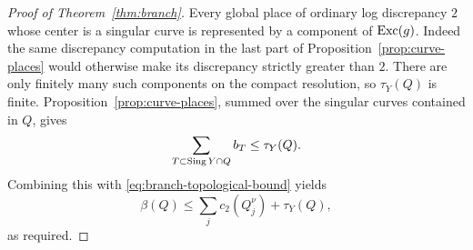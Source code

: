 \begin{proof}[Proof of Theorem~\ref{thm:branch}]
Every global place of ordinary log discrepancy \(2\) whose center
is a singular curve is represented by a component of \(\operatorname{Exc}(g)\).
Indeed the same discrepancy computation in the last part of
Proposition~\ref{prop:curve-places} would otherwise make its
discrepancy strictly greater than \(2\).  There are only finitely
many such components on the compact resolution, so
\(\tau_Y(Q)\) is finite.  Proposition~\ref{prop:curve-places},
summed over the singular curves contained in \(Q\), gives
\[
 \sum_{T\subset\operatorname{Sing} Y\cap Q} b_T\le\tau_Y(Q).
\]
Combining this with \eqref{eq:branch-topological-bound} yields
\[
 \beta(Q)\le \sum_j c_2(Q_j^\nu)+\tau_Y(Q),
\]
as required.
\end{proof}

